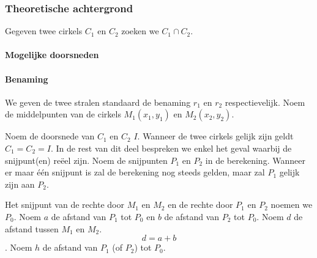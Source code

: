 \subsubsection{Theoretische achtergrond}
\begin{figure}[H]

\end{figure}

Gegeven twee cirkels $C_1$ en $C_2$ zoeken we $C_1 \cap C_2$.


\paragraph{Mogelijke doorsneden}

\paragraph{Benaming}
We geven de twee stralen standaard de benaming $r_1$ en $r_2$ respectievelijk.
Noem de middelpunten van de cirkels $M_1(x_1,y_1)$ en $M_2(x_2,y_2)$. 

Noem de doorsnede van $C_1$ en $C_2$ $I$. Wanneer de twee cirkels gelijk zijn geldt $C_1 = C_2 = I$.
In de rest van dit deel bespreken we enkel het geval waarbij de snijpunt(en) re\"eel zijn.
Noem de snijpunten $P_1$ en $P_2$ in de berekening.
Wanneer er maar \'e\'en snijpunt is zal de berekening nog steeds gelden, maar zal $P_1$ gelijk zijn aan $P_2$.

Het snijpunt van de rechte door $M_1$ en $M_2$ en de rechte door $P_1$ en $P_2$ noemen we $P_0$.
Noem $a$ de afstand van $P_1$ tot $P_0$ en $b$ de afstand van $P_2$ tot $P_0$.
Noem $d$ de afstand tussen $M_1$ en $M_2$.
\[
d = a + b
\]
.
Noem $h$ de afstand van $P_1$ (of $P_2$) tot $P_0$.

